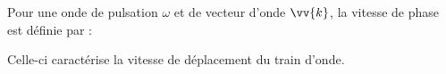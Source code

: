﻿\documentclass[a4paper]{article}
\begin{document}
\pagestyle{fancy}
\fancyhf{}
\setlength{\headheight}{15pt}

\begin{center}
	\large{}
\end{center}


Pour une onde de pulsation \(\omega\) et de vecteur d'onde \(\vv{k}\), la vitesse de phase est définie par :
\begin{center}
\end{center}
Celle-ci caractérise la vitesse de déplacement du train d'onde.
\end{document}
